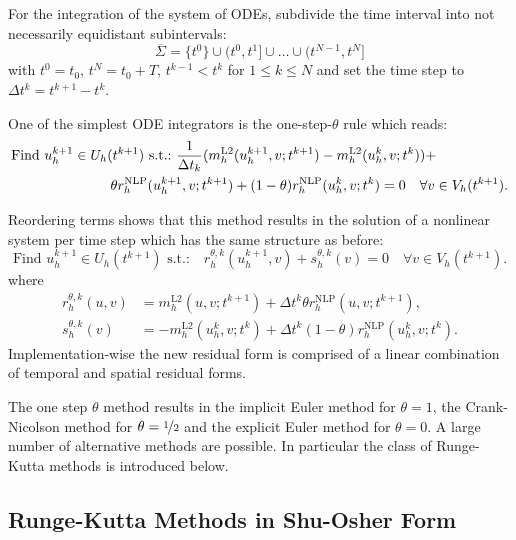 \documentclass[a4paper,12pt]{article}
\begin{document}
For the integration of the system of ODEs, subdivide the time interval into
not necessarily equidistant subintervals:
\begin{equation*}
\overline{\Sigma} = \{t^{0}\} \cup (t^0,t^1] \cup \ldots \cup (t^{N-1},t^N]
\end{equation*}
with $t^0=t_0$, $t^N=t_0+T$, $t^{k-1}<t^k$ for $1\leq k\leq N$ and
set  the time step to $\Delta t^k=t^{k+1}-t^k$.

One of the simplest ODE integrators is
the one-step-$\theta$ rule which reads:
\begin{equation}
\label{Eq:InstationaryProblem}
\begin{split}
&\text{Find $u_h^{k+1}\in U_h(t^{k+1})$ s.t.:}
\ \frac{1}{\Delta t_k}(m_h^\text{L2}(u_h^{k+1},v;t^{k+1})-m_h^\text{L2}(u_h^{k},v;t^{k})) + \\
&\hspace{25mm}\theta r_h^\text{NLP}(u_h^{k+1},v;t^{k+1}) + (1-\theta) r_h^\text{NLP}(u_h^{k},v;t^{k}) = 0
\quad \forall v\in V_h(t^{k+1}).
\end{split}
\end{equation}

Reordering terms shows that this method results in the solution
of a nonlinear system per time step which has the same structure as before:
\begin{equation*}
\text{Find $u_h^{k+1}\in U_h(t^{k+1})$ s.t.:}
\quad r_h^{\theta,k} (u_h^{k+1},v) + s_h^{\theta,k}(v) = 0
\quad \forall v\in V_h(t^{k+1}).
\end{equation*}
where
\begin{align*}
r^{\theta,k}_h(u,v) &= m_h^\text{L2}(u,v;t^{k+1})+\Delta t^k \theta r_h^\text{NLP}(u,v;t^{k+1}) ,\\
s^{\theta,k}_h(v) &= -m_h^\text{L2}(u^k_h,v;t^k) + \Delta t^k (1-\theta) r_h^\text{NLP}(u_h^k,v;t^k) .
\end{align*}
Implementation-wise the new residual form is comprised of a linear combination
of temporal and spatial residual forms.

The one step $\theta$ method results in the implicit Euler method for $\theta=1$,
the Crank-Nicolson method for $\theta=\nicefrac12$ and the explicit Euler method for $\theta=0$.
A large number of alternative methods are possible. In particular the class of
Runge-Kutta methods is introduced below.

\subsection*{Runge-Kutta Methods in Shu-Osher Form}
\end{document}
